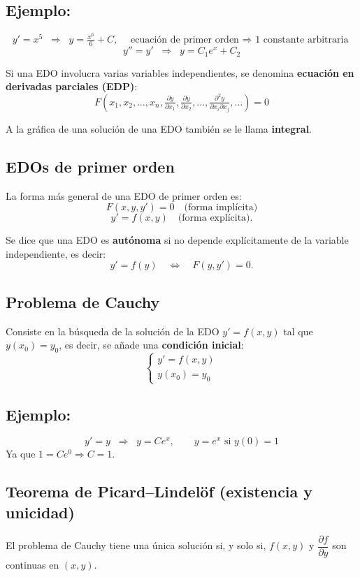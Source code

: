 \documentclass[a4paper,12pt]{article}
\begin{document}
\subsection*{Ejemplo:}
\[
y' = x^5 \;\;\Rightarrow\;\; y = \tfrac{x^6}{6} + C, \quad \text{ecuación de primer orden $\Rightarrow$ 1 constante arbitraria}
\]
\[
y'' = y' \;\;\Rightarrow\;\; y = C_1 e^x + C_2
\]

Si una EDO involucra varias variables independientes, se denomina \textbf{ecuación en derivadas parciales (EDP)}:
\[
F(x_1,x_2,\ldots,x_n, \tfrac{\partial y}{\partial x_1}, \tfrac{\partial y}{\partial x_2}, \ldots, \tfrac{\partial^2 y}{\partial x_i \partial x_j}, \ldots ) = 0
\]

A la gráfica de una solución de una EDO también se le llama \textbf{integral}.  

\subsection*{EDOs de primer orden}

La forma más general de una EDO de primer orden es:
\[
F(x,y,y')=0 \quad \text{(forma implícita)}
\]
\[
y' = f(x,y) \quad \text{(forma explícita)}.
\]

Se dice que una EDO es \textbf{autónoma} si no depende explícitamente de la variable independiente, es decir:
\[
y' = f(y) \quad \Leftrightarrow \quad F(y,y')=0.
\]
\newpage
\subsection{Problema de Cauchy}

Consiste en la búsqueda de la solución de la EDO $y' = f(x,y)$ tal que $y(x_0)=y_0$,
es decir, se añade una \textbf{condición inicial}:
\[
\begin{cases}
y' = f(x,y) \\
y(x_0) = y_0
\end{cases}
\]

\subsection*{Ejemplo:}
\[
y' = y \;\;\Rightarrow\;\; y = C e^x, \qquad y=e^x \text{ si } y(0)=1
\]
Ya que $1 = C e^0 \Rightarrow C=1$.

\subsection{Teorema de Picard–Lindelöf (existencia y unicidad)}
El problema de Cauchy tiene una única solución si, y solo si, $f(x,y)$ y
$\dfrac{\partial f}{\partial y}$ son continuas en $(x,y)$.
\end{document}
